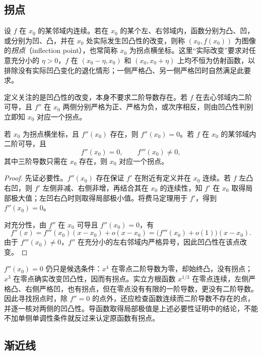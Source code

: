 \documentclass[UTF8,12pt,a4paper,fontset=fandol]{ctexbook}
\begin{document}
\subsection{拐点}
\label{subsec:inflection-points}

\begin{definition}
\label{def:inflection-point}
设 $f$ 在 $x_0$ 的某邻域内连续。若在 $x_0$ 的某个左、右邻域内，函数分别为凸、凹，或分别为凹、凸，并在 $x_0$ 处实际发生凹凸性的改变，则称 $(x_0,f(x_0))$ 为图像的\emph{拐点}（inflection point），也常简称 $x_0$ 为拐点横坐标。这里“实际改变”要求对任意充分小的 $\eta>0$，$f$ 在 $(x_0-\eta,x_0)$ 和 $(x_0,x_0+\eta)$ 上均不恒为仿射函数，以排除没有实际凹凸变化的退化情形；一侧严格凸、另一侧严格凹时自然满足此要求。
\end{definition}

定义关注的是凹凸性的改变，本身不要求二阶导数存在。若 $f$ 在去心邻域内二阶可导，且 $f''$ 在 $x_0$ 两侧分别严格为正、严格为负，或次序相反，则由凹凸性判别立即知 $x_0$ 对应一个拐点。

\begin{theorem}[拐点的必要条件与一个充分条件]
\label{thm:inflection-derivative-tests}
若 $x_0$ 为拐点横坐标，且 $f''(x_0)$ 存在，则 $f''(x_0)=0$。若 $f$ 在 $x_0$ 的某邻域内二阶可导，且
\[
    f''(x_0)=0,\qquad f'''(x_0)\neq0,
\]
其中三阶导数只需在 $x_0$ 存在，则 $x_0$ 对应一个拐点。
\end{theorem}

\begin{proof}
先证必要性。$f''(x_0)$ 存在保证 $f'$ 在附近有定义并在 $x_0$ 连续。若 $f$ 左凸右凹，则 $f'$ 左侧非减、右侧非增，再结合其在 $x_0$ 的连续性，知 $f'$ 在 $x_0$ 取得局部极大值；左凹右凸时则取得局部极小值。将费马定理用于 $f'$，得到 $f''(x_0)=0$。

对充分性，由 $f''$ 在 $x_0$ 可导且 $f''(x_0)=0$，有
\[
    f''(x)=f'''(x_0)(x-x_0)+o(x-x_0)
           =\bigl(f'''(x_0)+o(1)\bigr)(x-x_0).
\]
由于 $f'''(x_0)\neq0$，$f''$ 在充分小的左右邻域内严格异号，因此凹凸性在该点改变。
\end{proof}

$f''(x_0)=0$ 仍只是候选条件：$x^4$ 在零点二阶导数为零，却始终凸，没有拐点；$x^3$ 在零点确实改变凹凸性，因而有拐点。实立方根函数 $x^{1/3}$ 在零点连续，左侧严格凸、右侧严格凹，也有拐点，但在零点没有有限的一阶导数，更没有二阶导数。因此寻找拐点时，除 $f''=0$ 的点外，还应检查函数连续而二阶导数不存在的点，并逐一核对两侧的凹凸性。导函数取得局部极值是上述必要性证明中的结论，不能不加单侧单调性条件就反过来认定原函数有拐点。

\subsection{渐近线}
\label{subsec:asymptotes}
\end{document}
